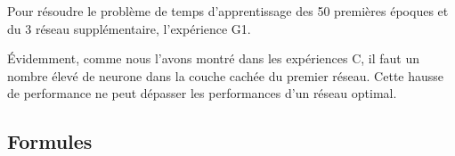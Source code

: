   Pour résoudre le problème de temps d'apprentissage des 50 premières époques et du 3 réseau supplémentaire,
  l'expérience G1.
  
  
  Évidemment, comme nous l'avons montré dans les expériences C, il faut un nombre élevé de neurone dans la couche cachée du premier réseau.
  Cette hausse de performance ne peut dépasser les performances d'un réseau optimal.
  
  

  \newpage 
  \subsection{Formules}
    
    
    
    


